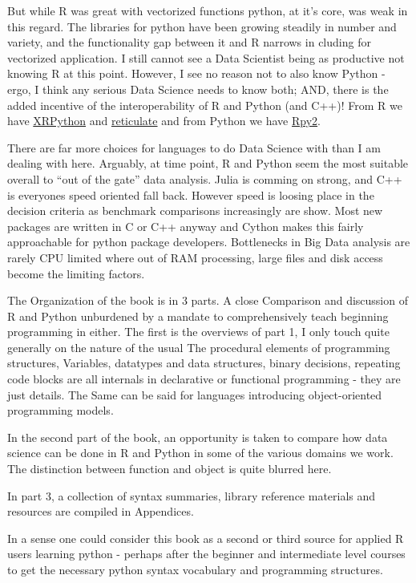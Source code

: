 \documentclass[]{book}
\theoremstyle{definition}
\theoremstyle{definition}
\theoremstyle{definition}
\theoremstyle{remark}
\begin{document}
But while R was great with vectorized functions python, at it's core,
was weak in this regard. The libraries for python have been growing
steadily in number and variety, and the functionality gap between it and
R narrows in cluding for vectorized application. I still cannot see a
Data Scientist being as productive not knowing R at this point. However,
I see no reason not to also know Python - ergo, I think any serious Data
Science needs to know both; AND, there is the added incentive of the
interoperability of R and Python (and C++)! From R we have
\href{https://cran.cnr.berkeley.edu/web/packages/XRPython/index.html}{XRPython}
and
\href{https://cran.cnr.berkeley.edu/web/packages/reticulate/index.html}{reticulate}
and from Python we have \href{https://rpy2.bitbucket.io/}{Rpy2}.

There are far more choices for languages to do Data Science with than I
am dealing with here. Arguably, at time point, R and Python seem the
most suitable overall to ``out of the gate'' data analysis. Julia is
comming on strong, and C++ is everyones speed oriented fall back.
However speed is loosing place in the decision criteria as benchmark
comparisons increasingly are show. Most new packages are written in C or
C++ anyway and Cython makes this fairly approachable for python package
developers. Bottlenecks in Big Data analysis are rarely CPU limited
where out of RAM processing, large files and disk access become the
limiting factors.

The Organization of the book is in 3 parts. A close Comparison and
discussion of R and Python unburdened by a mandate to comprehensively
teach beginning programming in either. The first is the overviews of
part 1, I only touch quite generally on the nature of the usual The
procedural elements of programming structures, Variables, datatypes and
data structures, binary decisions, repeating code blocks are all
internals in declarative or functional programming - they are just
details. The Same can be said for languages introducing object-oriented
programming models.

In the second part of the book, an opportunity is taken to compare how
data science can be done in R and Python in some of the various domains
we work. The distinction between function and object is quite blurred
here.

In part 3, a collection of syntax summaries, library reference materials
and resources are compiled in Appendices.

In a sense one could consider this book as a second or third source for
applied R users learning python - perhaps after the beginner and
intermediate level courses to get the necessary python syntax vocabulary
and programming structures.
\end{document}
